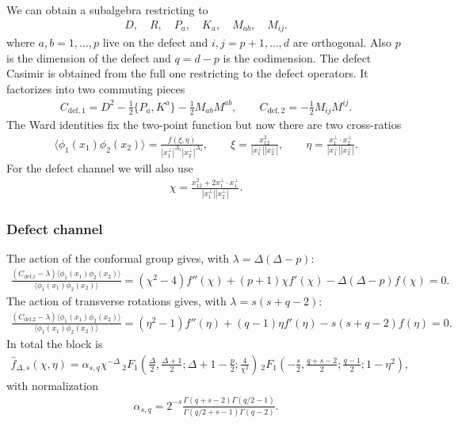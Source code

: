 \documentclass[letterpaper]{article}
\let\Oldsubsubsection\subsubsection
\renewcommand{\subsubsection}{\FloatBarrier\Oldsubsubsection}
\begin{document}
We can obtain a subalgebra restricting to
\begin{align}
 D, \quad
 R, \quad
 P_{a}, \quad
 K_{a}, \quad
 M_{ab}, \quad
 M_{ij}.
\end{align}
where $a,b = 1, \ldots, p$ live on the defect and $i,j= p+1, \ldots, d$ are orthogonal. Also $p$ is the dimension of the defect and $q  = d-p$ is the codimension.
The defect Casimir is obtained from the full one restricting to the defect operators.
It factorizes into two commuting pieces
\begin{align}
 C_{\text{def}, 1} = 
    D^2
  - \frac12 \{ P_{a}, K^{a} \}
  - \frac{1}{2} M_{ab} M^{ab}, \qquad
 C_{\text{def}, 2} 
  = - \frac{1}{2} M_{ij} M^{ij}.
\end{align}
The Ward identities fix the two-point function but now there are two cross-ratios
\begin{align}
 \langle \phi_1(x_1) \phi_2(x_2) \rangle
 = \frac{f(\xi, \eta)}{|x_1^\bot|^{\Delta_1} |x_2^\bot|^{\Delta_2}}, \qquad
 \xi = \frac{x_{12}^2}{|x_1^{\bot}| |x_2^{\bot}|}, \qquad
 \eta = \frac{x_{1}^\bot \cdot x_2^\bot}{|x_1^{\bot}| |x_2^{\bot}|}.
\end{align}
For the defect channel we will also use 
\begin{align}
 \chi = \frac{ x_{12}^2 + 2 x_1^\bot \cdot x_1^\bot}
             { |x_1^\bot| |x_2^\bot| } .
\end{align}



\subsubsection{Defect channel}

The action of the conformal group gives, with $\lambda = \Delta(\Delta-p)$:
\begin{align}
 \frac{(C_{\text{def,1}} - \lambda) \langle \phi_1(x_1) \phi_2(x_2) \rangle}
      {\langle \phi_1(x_1) \phi_2(x_2) \rangle}
 = (\chi^2 - 4) f''(\chi) + (p+1) \chi f'(\chi) - \Delta(\Delta-p) f(\chi)
 = 0.
\end{align}
The action of transverse rotations gives, with $\lambda = s(s + q - 2)$:
\begin{align}
 \frac{(C_{\text{def,2}} - \lambda) \langle \phi_1(x_1) \phi_2(x_2) \rangle}
      {\langle \phi_1(x_1) \phi_2(x_2) \rangle}
 = (\eta^2 - 1) f''(\eta) + (q-1) \eta f'(\eta) - s(s+q-2) f(\eta)
 = 0.
\end{align}
In total the block is
\begin{align}
 \hat f_{\Delta,s}(\chi,\eta) 
 = \alpha_{s,q} \chi ^{-\Delta } 
 \, _2F_1\left(\frac{\Delta }{2},\frac{\Delta +1}{2};\Delta+1-\frac{p}{2};\frac{4}{\chi ^2}\right)
 \, _2F_1\left(-\frac{s}{2},\frac{q+s-2}{2};\frac{q-1}{2};1-\eta ^2\right),
\end{align}
with normalization
\begin{align}
 \alpha_{s,q} = 2^{-s} \frac{\Gamma(q+s-2) \Gamma(q/2-1)}{\Gamma(q/2+s-1) \Gamma(q-2)}.
\end{align}
\end{document}
